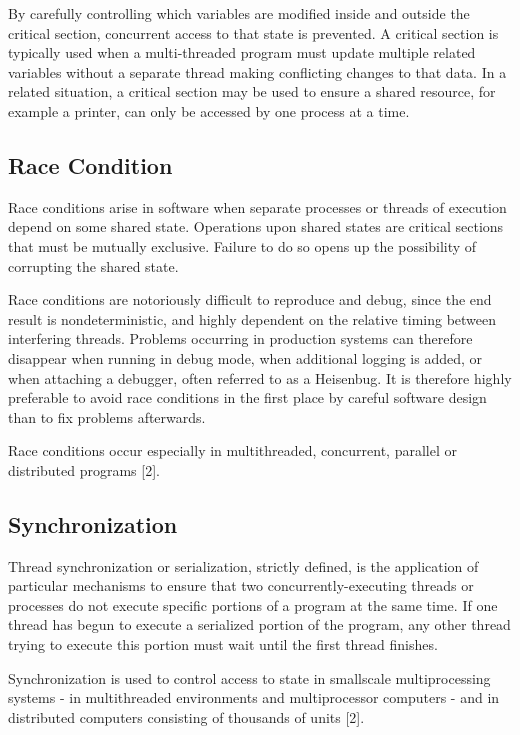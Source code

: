 By carefully controlling which variables are modified inside and outside the critical section, concurrent access to that state is prevented. A critical section is typically used when a multi-threaded program must update multiple related variables without a separate thread making conflicting changes to that data. In a related situation, a critical section may be used to ensure a shared resource, for example a printer, can only be accessed by one process at a time.

\subsection{Race Condition}
Race conditions arise in software when separate processes or threads of execution depend on some shared state. Operations upon shared states are critical sections that must be mutually exclusive. Failure to do so opens up the possibility of corrupting the shared state.

Race conditions are notoriously difficult to reproduce and debug, since the end result is nondeterministic, and highly dependent on the relative timing between interfering threads. Problems occurring in production systems can therefore disappear when running in debug mode, when additional logging is added, or when attaching a debugger, often referred to as a Heisenbug. It is therefore highly preferable to avoid race conditions in the first place by careful software design than to fix problems afterwards.

Race conditions occur especially in multithreaded, concurrent, parallel or distributed programs [2].

\subsection{Synchronization}

Thread synchronization or serialization, strictly defined, is the application of particular mechanisms to ensure that two concurrently-executing threads or processes do not execute specific portions of a program at the same time. If one thread has begun to execute a serialized portion of the program, any other thread trying to execute this portion must wait until the first thread finishes.

Synchronization is used to control access to state in smallscale multiprocessing systems - in multithreaded environments and multiprocessor computers - and in distributed computers consisting of thousands of units [2].

